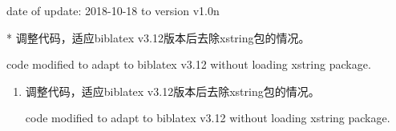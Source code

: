


date of update: 2018-10-18 to version v1.0n

* 调整代码，适应biblatex v3.12版本后去除xstring包的情况。

code modified to adapt to biblatex v3.12 without loading xstring package.

\label{up:181104}
\begin{enumerate}

\item 调整代码，适应biblatex v3.12版本后去除xstring包的情况。

code modified to adapt to biblatex v3.12 without loading xstring package.


\end{enumerate}


